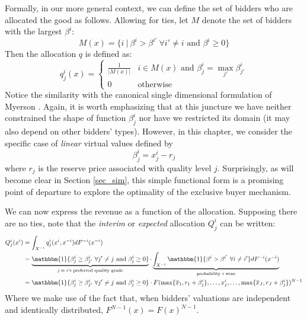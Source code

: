 \documentclass{article}
\begin{document}
Formally, in our more general context, we can define the set of bidders who are allocated the good as follows. Allowing for ties, let $M$ denote the set of bidders with the largest $\beta^i$:
\begin{equation}
    M(x) = \{ i \ | \ \beta^i > \beta^{i'} \ \forall i' \neq i \text{ and } \beta^i \geq 0 \}
\end{equation}
\noindent Then the allocation $q$ is defined as:
\begin{equation}
    q_j^i(x) = \begin{cases}
        \frac{1}{|M(x)|} & i \in M(x) \text{ and } \beta_j^i = \max_{j'} \beta_{j'}^i \\
        0 & \text{otherwise}
    \end{cases}
\end{equation}
\noindent Notice the similarity with the canonical single dimensional formulation of Myerson \autocite*{myerson1981optimal}. Again, it is worth emphasizing that at this juncture we have neither constrained the shape of function $\beta_j^i$ nor have we restricted its domain (it may also depend on other bidders' types). However, in this chapter, we consider the specific case of \textit{linear} virtual values defined by
\begin{equation}
    \beta_j^i = x_j^i - r_j
\end{equation}
\noindent where $r_j$ is the reserve price associated with quality level $j$. Surprisingly, as will become clear in Section \ref{sec_sim}, this simple functional form is a promising point of departure to explore the optimality of the exclusive buyer mechanism. 

We can now express the revenue as a function of the allocation. Supposing there are no ties, note that the \textit{interim} or \textit{expected} allocation $Q_j^i$ can be written:
\begin{align}
    Q_j^i(x^i) &= \int_{X^{-i}} q_j^i(x^i,x^{-i}) dF^{-i}(x^{-i}) \\
        &= \underbrace{\mathbbm{1} \{ \beta_j^i \geq \beta_{j'}^i \ \forall j' \neq j \text{ and } \beta_j^i \geq 0 \}}_{\text{$j$ is $i$'s preferred quality grade}} \cdot \underbrace{\int_{X^{-i}} \mathbbm{1} \{ \beta^i > \beta^{i'} \ \forall i \neq i' \} dF^{-i}(x^{-i})}_{\text{probability $i$ wins}} \\
        &= \mathbbm{1} \{ \beta_j^i \geq \beta_{j'}^i \ \forall j' \neq j \text{ and } \beta_j^i \geq 0 \} \cdot F(\max \{ \overline{x}_1, r_1 + \beta_j^i \}, \dots, x_j^i, \dots, \max \{ \overline{x}_J, r_J + \beta_j^i \})^{N-1}
\end{align}
\noindent Where we make use of the fact that, when bidders' valuations are independent and identically distributed, $F^{N-1}(x) = F(x)^{N-1}$. 
\end{document}
